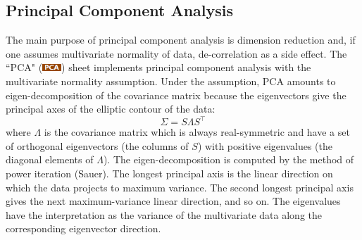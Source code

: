\documentclass[article]{jss}
\newcommand{\shtPCA}{``PCA" (\includegraphics[height=8pt, keepaspectratio=true]{PcaSheetTab_png}) }
\begin{document}
        \subsection[egPCA]{Principal Component Analysis}
        The main purpose of principal component analysis is dimension reduction and, if one assumes multivariate normality of data, de-correlation as a side effect. The \shtPCA sheet implements principal component analysis with the multivariate normality assumption. Under the assumption, PCA amounts to eigen-decomposition of the covariance matrix because the eigenvectors give the principal axes of the elliptic contour of the data: $$\Sigma = S\Lambda S^\intercal$$ where $\Lambda$ is the covariance matrix which is always real-symmetric and have a set of orthogonal eigenvectors (the columns of $S$) with positive eigenvalues (the diagonal elements of $\Lambda$). The eigen-decomposition is computed by the method of power iteration (Sauer). The longest principal axis is the linear direction on which the data projects to maximum variance. The second longest principal axis gives the next maximum-variance linear direction, and so on. The eigenvalues have the interpretation as the variance of the multivariate data along the corresponding eigenvector direction.
        
\end{document}
